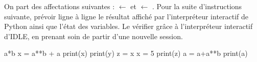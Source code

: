 On part des affectations suivantes :  $\leftarrow$  et  $\leftarrow$ . 
Pour la suite d'instructions suivante, prévoir ligne à ligne le résultat affiché par l'interpréteur interactif de Python ainsi que l'état des variables.
Le vérifier grâce à l'interpréteur interactif d'IDLE, en prenant soin de partir d'une nouvelle session. 
\begin{pyverbatim}
a*b
x = a**b + a
print(x)
print(y)
z = x
x = 5
print(z)
a = a+a**b
print(a)
\end{pyverbatim}